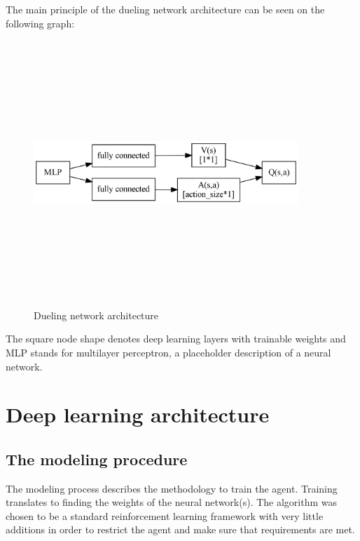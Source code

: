 \documentclass[
]{elteikthesis}[2023/04/10]
\begin{document}
The main principle of the dueling network architecture can be seen
on the following graph:

\begin{figure}[H]
\begin{centering}
\includegraphics[width=10cm,height=10cm,keepaspectratio]{images/ann_dueling_demo}
\par\end{centering}
\caption{Dueling network architecture}
\end{figure}

The square node shape denotes deep learning layers with trainable
weights and MLP stands for multilayer perceptron, a placeholder description
of a neural network.

\newpage{}

\chapter{Deep learning architecture}

\section{The modeling procedure}

The modeling process describes the methodology to train the agent.
Training translates to finding the weights of the neural network(s).
The algorithm was chosen to be a standard reinforcement learning
framework with very little additions in order to restrict the agent
and make sure that requirements are met.
\end{document}
